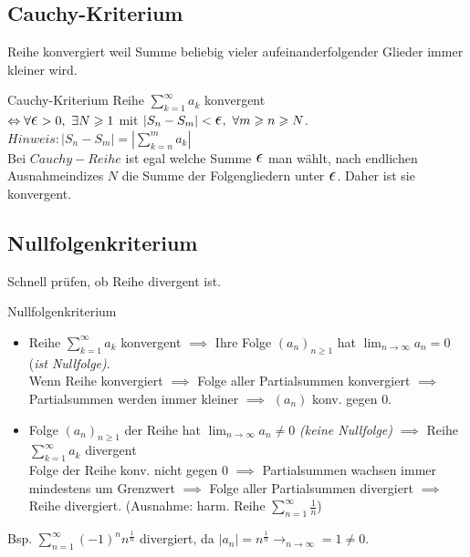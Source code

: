 \documentclass[a4paper]{article}
\let\oldepsilon\epsilon
\renewcommand{\epsilon}{\text{\Large $\oldepsilon$}}
\def\limn{\lim_{n\to \infty}}
\begin{document}
\subsection{Cauchy-Kriterium}
Reihe konvergiert weil Summe beliebig vieler aufeinanderfolgender Glieder immer kleiner wird.
\begin{mainbox}{Cauchy-Kriterium}
  Reihe $\sum_{k=1}^{\infty} a_k$ konvergent \\
  $\Leftrightarrow  \forall \epsilon >0, \ \exists N \geqslant 1$ mit $|S_n - S_m| < \epsilon, \ \forall m \geqslant n \geqslant N$. \\
  $Hinweis: | S_n - S_m | = | \sum_{k=n}^{m} a_k | $ \\
  \tiny \color{gray}
    Bei $Cauchy-Reihe$ ist egal welche Summe $\epsilon$ man wählt, nach endlichen Ausnahmeindizes $N$ die Summe der Folgengliedern unter $\epsilon$. Daher ist sie konvergent.
  \normalsize \color{black}   
\end{mainbox}

\subsection{Nullfolgenkriterium}
Schnell prüfen, ob Reihe divergent ist.
\begin{mainbox}{Nullfolgenkriterium}
    \begin{itemize}[leftmargin=3mm, topsep=1pt, parsep=1pt]
      \item Reihe $\sum_{k  = 1}^{\infty} a_k$ konvergent $\implies$ Ihre Folge $(a_n)_{n \geqslant 1}$ hat $\limn a_n = 0$ (\textit{ist Nullfolge)}. \\
          \tiny \color{gray}
            Wenn Reihe konvergiert $\implies$ Folge aller Partialsummen konvergiert $\implies$ Partialsummen werden immer kleiner $\implies$ $(a_n)$ konv. gegen 0. 
          \normalsize \color{black}
      \item Folge $(a_n)_{n \geqslant 1}$ der Reihe hat $\limn a_n \neq 0$ \textit{(keine Nullfolge)} $\implies$ Reihe $\sum_{k = 1}^{\infty} a_k$ divergent  \\
          \tiny \color{gray}
            Folge der Reihe konv. nicht gegen 0 $\implies$ Partialsummen wachsen immer mindestens um Grenzwert $\implies$ Folge aller Partialsummen divergiert $\implies$ Reihe divergiert. 
          \normalsize \color{black}
            (Ausnahme: harm. Reihe $\sum_{n=1}^{\infty} \frac{1}{n}$)
    \end{itemize}
\end{mainbox}
Bsp. $\sum_{n=1}^{\infty}(-1)^n n^{\frac{1}{n}}$ divergiert, da $|a_n| = n^{\frac{1}{n}} \rightarrow_{n \rightarrow \infty} = 1 \neq 0$.
\end{document}
